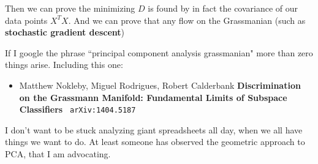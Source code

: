 \documentclass[12pt]{article}
\begin{document}
\newpage

\noindent Then we can prove the minimizing $D$ is found by in fact the covariance of our data points $X^T X$.  And we can prove that any flow on the Grassmanian (such as \textbf{stochastic gradient descent}) \\

\selectfont \fontsize{10}{15}\selectfont

\noindent If I google the phrase ``{\color{blue!50!green}principal component analysis grassmanian}" more than zero things arise. Including this one:
\begin{itemize}
\item Matthew Nokleby, Miguel Rodrigues, Robert Calderbank \textbf{Discrimination on the Grassmann Manifold: Fundamental Limits of Subspace Classifiers} \texttt{ arXiv:1404.5187}
\end{itemize}
I don't want to be stuck analyzing giant spreadsheets all day, when we all have things we want to do.  At least someone has observed the geometric approach to PCA, that I am advocating. 
\end{document}

